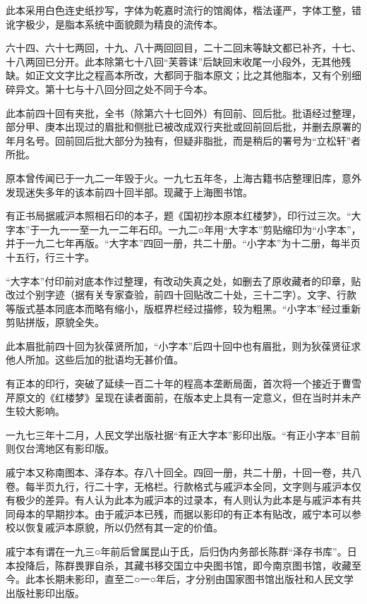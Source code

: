 此本采用白色连史纸抄写，字体为乾嘉时流行的馆阁体，楷法谨严，字体工整，错讹字极少，是脂本系统中面貌颇为精良的流传本。

六十四、六十七两回，十九、八十两回回目，二十二回末等缺文都已补齐，十七、十八两回已分开。此本除第七十八回``芙蓉诔''后缺回末收尾一小段外，无其他残缺。如正文文字比之程高本所改，大都同于脂本原文；比之其他脂本，又有个别细碎异文。第十七与十八回分回之处不同于今本。

此本前四十回有夹批，全书（除第六十七回外）有回前、回后批。批语经过整理，部分甲、庚本出现过的眉批和侧批已被改成双行夹批或回前回后批，并删去原署的年月名号。回前回后批大部分为独有，但疑非脂批，而是稍后的署号为``立松轩''者所批。

原本曾传闻已于一九二一年毁于火。一九七五年冬，上海古籍书店整理旧库，意外发现迷失多年的该本前四十回半部。现藏于上海图书馆。

有正书局据戚沪本照相石印的本子，题《国初抄本原本红楼梦》，印行过三次。``大字本''于一九一一至一九一二年石印。一九二○年用``大字本''剪贴缩印为``小字本''，并于一九二七年再版。``大字本''四回一册，共二十册。``小字本''为十二册，每半页十五行，行三十字。

``大字本''付印前对底本作过整理，有改动失真之处，如删去了原收藏者的印章，贴改过个别字迹（据有关专家查验，前四十回贴改二十处，三十二字）。文字、行款等版式基本同底本而略有缩小，版框界栏经过描修，较为粗黑。``小字本''经过重新剪贴拼版，原貌全失。

此本眉批前四十回为狄葆贤所加，``小字本''后四十回中也有眉批，则为狄葆贤征求他人所加。这些后加的批语均无甚价值。

有正本的印行，突破了延续一百二十年的程高本垄断局面，首次将一个接近于曹雪芹原文的《红楼梦》呈现在读者面前，在版本史上具有一定意义，但在当时并未产生较大影响。

一九七三年十二月，人民文学出版社据``有正大字本''影印出版。``有正小字本''目前则仅台湾地区有影印版。

戚宁本又称南图本、泽存本。存八十回全。四回一册，共二十册，十回一卷，共八卷。每半页九行，行二十字，无格栏。行款格式与戚沪本全同，文字则与戚沪本仅有极少的差异。有人认为此本为戚沪本的过录本，有人则认为此本是与戚沪本有共同母本的早期抄本。由于戚沪本已残，而据以影印的有正本有贴改，戚宁本可以参校以恢复戚沪本原貌，所以仍然有其一定的价值。

戚宁本有谓在一九三○年前后曾属昆山于氏，后归伪内务部长陈群``泽存书库''。日本投降后，陈群畏罪自杀，其藏书移交国立中央图书馆，即今南京图书馆，收藏至今。此本长期未影印，直至二○一○年后，才分别由国家图书馆出版社和人民文学出版社影印出版。

{ }


